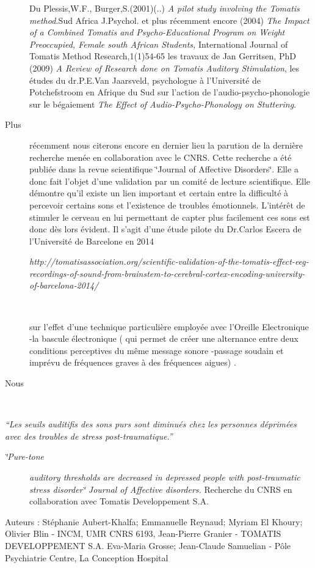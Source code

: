 \documentclass[12pt,french]{report}
\makeatletter
\let\SF@@footnote\footnote
\def\footnote{\ifx\protect\@typeset@protect
    \expandafter\SF@@footnote
  \else
    \expandafter\SF@gobble@opt
  \fi
}
\edef\SF@gobble@opt{\noexpand\protect
  \expandafter\noexpand\csname SF@gobble@opt \endcsname}
\makeatother
\begin{document}
\begin{description}
{Du Plessis,W.F., Burger,S.(2001)(..) \emph{A pilot study involving
the Tomatis method.}Sud Africa J.Psychol. et plus récemment encore
(2004) \emph{The Impact of a Combined Tomatis and Psycho-Educational
Program on Weight Preoccupied, Female south African Students, }International
Journal of Tomatis Method Research,1(1)54-65} les travaux de Jan Gerritsen, PhD (2009) \footnote{\emph{A Review of Research done on Tomatis Auditory Stimulation}},
les études du dr.P.E.Van Jaarsveld, psychologue à l'Université de
Potchefstroom en Afrique du Sud sur l'action de l'audio-psycho-phonologie
sur le bégaiement \footnote{\emph{The Effect of Audio-Psycho-Phonology on Stuttering}}.
\item [{Plus}] récemment nous citerons encore en dernier lieu la parution
de la dernière recherche menée en collaboration avec le CNRS. Cette
recherche a été publiée dans la revue scientifique \char`\"{}Journal
of Affective Disorders\char`\"{}. Elle a donc fait l'objet d'une validation
par un comité de lecture scientifique. Elle démontre qu'il existe
un lien important et certain entre la difficulté à percevoir certains
sons et l'existence de troubles émotionnels. L'intérêt de stimuler
le cerveau en lui permettant de capter plus facilement ces sons est
donc dès lors évident. Il s'agit d'une étude pilote du Dr.Carlos Escera
de l'Université de Barcelone en 2014 \footnote{\begin{description}
\item [{\emph{http://tomatisassociation.org/scientific-validation-of-the-tomatis-effect-eeg-recordings-of-sound-from-brainstem-to-cerebral-cortex-encoding-university-of-barcelona-2014/}}]~
\end{description}
}sur l'effet d'une technique particulière employée avec l'Oreille Electronique
-la bascule électronique \footnote{( qui permet de créer une alternance entre deux conditions perceptives
du même message sonore -passage soudain et imprévu de fréquences graves
à des fréquences aigues) . }
\item [{Nous}]~
\end{description}
\emph{}\footnote{\emph{``Les seuils auditifis des sons purs sont diminués chez les
personnes déprimées avec des troubles de stress post-traumatique.''}
\begin{description}
\item [{\emph{\char`\"{}Pure-tone}}] \emph{auditory thresholds are decreased
in depressed people with post-traumatic stress disorder\char`\"{}
Journal of Affective disorders.} Recherche du CNRS en collaboration
avec Tomatis Developpement S.A.
\end{description}
Auteurs : Stéphanie Aubert-Khalfa; Emmanuelle Reynaud; Myriam El Khoury;
Olivier Blin - INCM, UMR CNRS 6193, Jean-Pierre Granier - TOMATIS
DEVELOPPEMENT S.A. Eva-Maria Grosse; Jean-Claude Samuelian - Pôle
Psychiatrie Centre, La Conception Hospital }
\end{document}
